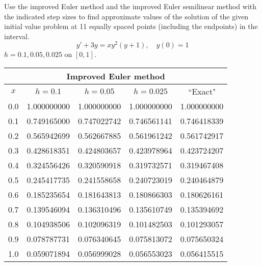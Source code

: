 \documentclass{ximera}
\begin{document}
\begin{problem}\label{exer:3.2.20} Use the improved Euler method and the improved Euler semilinear method with the indicated step sizes to find approximate values of the solution of the given initial value problem at 11 equally spaced points (including the endpoints) in the interval.
$$y'+3y=xy^2(y+1),\quad y(0)=1$$
$h=0.1,0.05,0.025$ on $[0,1]$.

\begin{solution}
    {\small
\begin{tabular}{|c|r|r|r|r|}
\hline
\multicolumn{5}{|c|}{Improved Euler method}\\\hline
\multicolumn{1}{|c|}{$x$}&
\multicolumn{1}{|c|}{$h=0.1$}&
\multicolumn{1}{|c|}{$h=0.05$}&
\multicolumn{1}{|c|}{$h=0.025$}&
\multicolumn{1}{|c|}{``Exact"}\\ \hline
0.0 & 1.000000000 & 1.000000000 & 1.000000000 & 1.000000000 \\
0.1 & 0.749165000 & 0.747022742 & 0.746561141 & 0.746418339 \\
0.2 & 0.565942699 & 0.562667885 & 0.561961242 & 0.561742917 \\
0.3 & 0.428618351 & 0.424803657 & 0.423978964 & 0.423724207 \\
0.4 & 0.324556426 & 0.320590918 & 0.319732571 & 0.319467408 \\
0.5 & 0.245417735 & 0.241558658 & 0.240723019 & 0.240464879 \\
0.6 & 0.185235654 & 0.181643813 & 0.180866303 & 0.180626161 \\
0.7 & 0.139546094 & 0.136310496 & 0.135610749 & 0.135394692 \\
0.8 & 0.104938506 & 0.102096319 & 0.101482503 & 0.101293057 \\
0.9 & 0.078787731 & 0.076340645 & 0.075813072 & 0.075650324 \\
1.0 & 0.059071894 & 0.056999028 & 0.056553023 & 0.056415515 \\
\hline
\end{tabular}}


\end{solution}
\end{problem}
\end{document}
